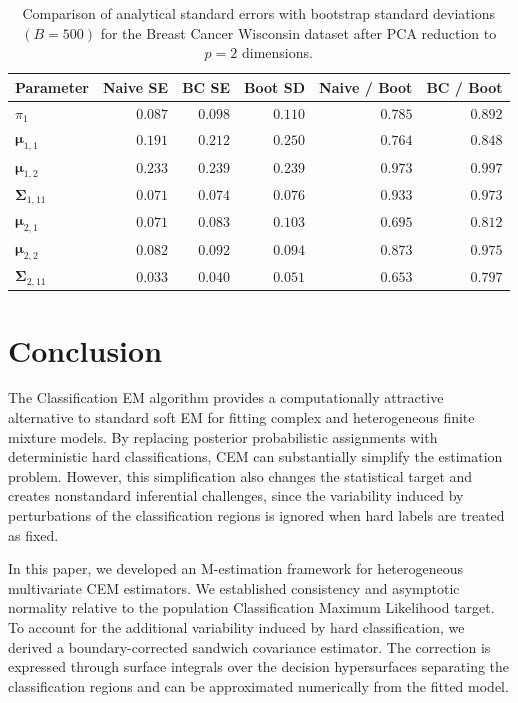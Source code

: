 \documentclass[pdflatex,sn-mathphys-ay]{sn-jnl}%
\let\oldmu\mu
\renewcommand{\mu}{\boldsymbol{\oldmu}}
\let\oldSigma\Sigma
\renewcommand{\Sigma}{\boldsymbol{\oldSigma}}
\theoremstyle{thmstyleone}%
\theoremstyle{thmstyletwo}%
\theoremstyle{thmstylethree}%
\begin{document}
\begin{table}[htbp]
\centering
\caption{Comparison of analytical standard errors with bootstrap standard deviations $(B=500)$ for the Breast Cancer Wisconsin dataset after PCA reduction to $p=2$ dimensions.}
\label{tab:breast_cancer_se}
\begin{tabular}{lrrrrr}
\toprule
Parameter & Naive SE & BC SE & Boot SD & Naive / Boot & BC / Boot \\
\midrule
$\pi_1$ & $0.087$ & $0.098$ & $0.110$ & $0.785$ & $0.892$ \\
$\mu_{1,1}$ & $0.191$ & $0.212$ & $0.250$ & $0.764$ & $0.848$ \\
$\mu_{1,2}$ & $0.233$ & $0.239$ & $0.239$ & $0.973$ & $0.997$ \\
$\Sigma_{1,11}$ & $0.071$ & $0.074$ & $0.076$ & $0.933$ & $0.973$ \\
$\mu_{2,1}$ & $0.071$ & $0.083$ & $0.103$ & $0.695$ & $0.812$ \\
$\mu_{2,2}$ & $0.082$ & $0.092$ & $0.094$ & $0.873$ & $0.975$ \\
$\Sigma_{2,11}$ & $0.033$ & $0.040$ & $0.051$ & $0.653$ & $0.797$ \\
\bottomrule
\end{tabular}
\end{table}

\section{Conclusion}

The Classification EM algorithm provides a computationally attractive alternative to standard soft EM for fitting complex and heterogeneous finite mixture models. By replacing posterior probabilistic assignments with deterministic hard classifications, CEM can substantially simplify the estimation problem. However, this simplification also changes the statistical target and creates nonstandard inferential challenges, since the variability induced by perturbations of the classification regions is ignored when hard labels are treated as fixed.

In this paper, we developed an M-estimation framework for heterogeneous multivariate CEM estimators. We established consistency and asymptotic normality relative to the population Classification Maximum Likelihood target. To account for the additional variability induced by hard classification, we derived a boundary-corrected sandwich covariance estimator. The correction is expressed through surface integrals over the decision hypersurfaces separating the classification regions and can be approximated numerically from the fitted model.
\end{document}

